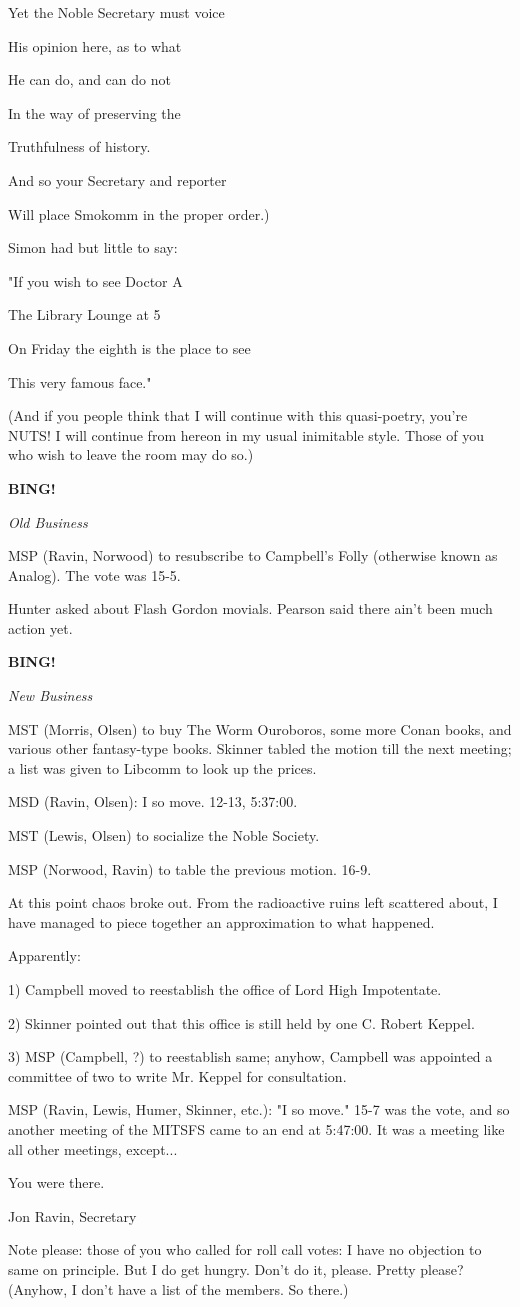 \documentclass[12pt]{article}
\newcommand{\bing}{{\bf BING!} }
\newcommand{\goto}[1]{\bing \vskip 12pt \centerline{{\em{#1}}}}
\begin{document}
Yet the Noble Secretary must voice

His opinion here, as to what

He can do, and can do not

In the way of preserving the

Truthfulness of history.

And so your Secretary and reporter

Will place Smokomm in the proper order.)

Simon had but little to say:

"If you wish to see Doctor A

The Library Lounge at 5

On Friday the eighth is the place to see

This very famous face."

(And if you people think that I will continue with this quasi-poetry, you're NUTS! I will continue from hereon in my usual inimitable style. Those of you who wish to leave the room may do so.)

\goto{Old Business}

MSP (Ravin, Norwood) to resubscribe to Campbell's Folly (otherwise known as Analog). The vote was 15-5.

Hunter asked about Flash Gordon movials. Pearson said there ain't been much action yet.

\goto{New Business}

MST (Morris, Olsen) to buy The Worm Ouroboros, some more Conan books, and various other fantasy-type books. Skinner tabled the motion till the next meeting; a list was given to Libcomm to look up the prices.

MSD (Ravin, Olsen): I so move. 12-13, 5:37:00.

MST (Lewis, Olsen) to socialize the Noble Society.

MSP (Norwood, Ravin) to table the previous motion. 16-9.

At this point chaos broke out. From the radioactive ruins left scattered about, I have managed to piece together an approximation to what happened.

Apparently:

1) Campbell moved to reestablish the office of Lord High Impotentate.

2) Skinner pointed out that this office is still held by one C. Robert Keppel.

3) MSP (Campbell, ?) to reestablish same; anyhow, Campbell was appointed a committee of two to write Mr. Keppel for consultation.

MSP (Ravin, Lewis, Humer, Skinner, etc.): "I so move." 15-7 was the vote, and so another meeting of the MITSFS came to an end at 5:47:00. It was a meeting like all other meetings, except...

You were there.

\vspace{12pt}

\centerline{Jon Ravin, Secretary}

Note please: those of you who called for roll call votes: I have no objection to same on principle. But I do get hungry. Don't do it, please. Pretty please? (Anyhow, I don't have a list of the members. So there.)
\end{document}
